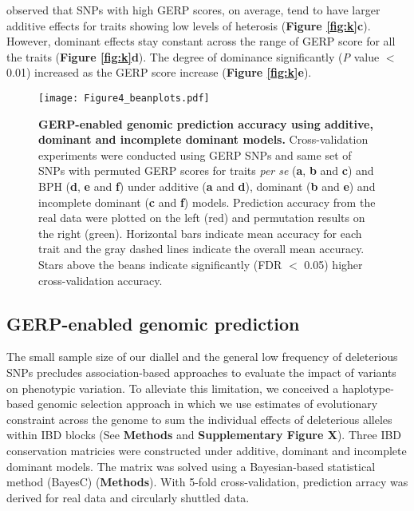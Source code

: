 \documentclass[twoside, twocolumn, letterpaper]{article}
\renewcommand{\baselinestretch}{1}
\newcommand{\jri}[1]{\todo[size=\scriptsize, color=flame]{#1}}
\begin{document}
 observed that SNPs with high GERP scores, on average, tend to have larger additive effects for traits showing low levels of heterosis (\textbf{Figure \ref{fig:k}c}).
However, dominant effects stay constant across the range of GERP score for all the traits (\textbf{Figure \ref{fig:k}d}). 
The degree of dominance significantly (\emph{P} value $<$ 0.01) increased as the GERP score increase (\textbf{Figure \ref{fig:k}e}). 

\begin{figure*}[tbh]   
  \begin{center}
   \vspace{-2mm}
   \texttt{[image: Figure4\_beanplots.pdf]}
   \renewcommand{\baselinestretch}{0.9}
   \vspace{-3mm}
   \caption{{\bfseries GERP-enabled genomic prediction accuracy using additive, dominant and incomplete dominant models.} Cross-validation experiments were conducted using GERP SNPs and same set of SNPs with permuted GERP scores for traits \emph{per se} (\textbf{a}, \textbf{b} and \textbf{c}) and BPH (\textbf{d}, \textbf{e} and \textbf{f}) under additive (\textbf{a} and \textbf{d}), dominant (\textbf{b} and \textbf{e}) and incomplete dominant (\textbf{c} and \textbf{f}) models. Prediction accuracy from the real data were plotted on the left (red) and permutation results on the right (green). Horizontal bars indicate mean accuracy for each trait and the gray dashed lines indicate the overall mean accuracy. Stars above the beans indicate significantly (FDR $<$ 0.05) higher cross-validation accuracy.     } 
    \vspace{-4mm}
    \label{fig:beanplots}
  \end{center}
\end{figure*}


\subsection*{GERP-enabled genomic prediction}

The small sample size of our diallel and the general low frequency of deleterious SNPs precludes association-based approaches to evaluate the impact of variants on phenotypic variation.
To alleviate this limitation, we conceived a haplotype-based genomic selection approach in which we use estimates of evolutionary constraint across the genome to sum the individual effects of deleterious alleles within IBD blocks (See \textbf{Methods} and \textbf{Supplementary Figure X}\jri{figure ref}). Three IBD conservation matricies were constructed under additive, dominant and incomplete dominant models. The matrix was solved using a Bayesian-based statistical method (BayesC) \citep{habier2011extension} (\textbf{Methods}).
With 5-fold cross-validation, prediction arracy was derived for real data and circularly shuttled data. 
\end{document}
